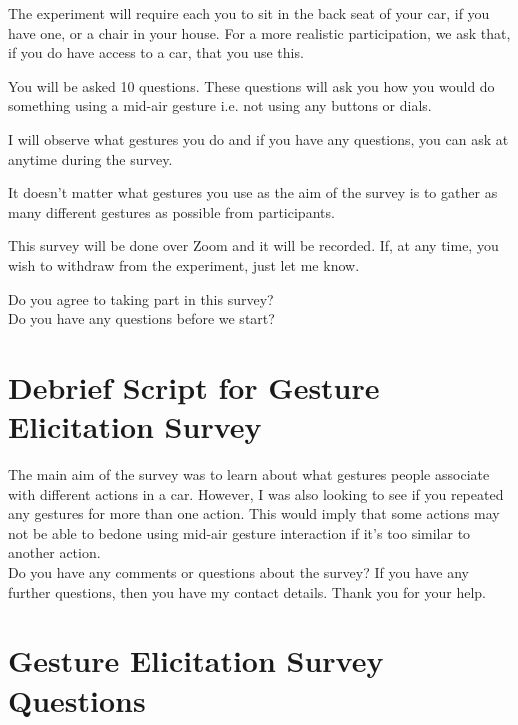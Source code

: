 \documentclass{l4proj}
\begin{document}
\begin{appendices}
The experiment will require each you to sit in the back seat of your car, if you have one, or a chair in your house. For a more realistic participation, we ask that, if you do have access to a car, that you use this.

You will be asked 10 questions. These questions will ask you how you would do something using a mid-air gesture i.e. not using any buttons or dials.

I will observe what gestures you do and if you have any questions, you can ask at anytime during the survey.

It doesn’t matter what gestures you use as the aim of the survey is to gather as many different gestures as possible from participants. 

This survey will be done over Zoom and it will be recorded. If, at any time, you wish to withdraw from the experiment, just let me know. 

Do you agree to taking part in this survey?\\Do you have any questions before we start?

\section{Debrief Script for Gesture Elicitation Survey}
\label{section:debriefScriptGE}
The main aim of the survey was to learn about what gestures people associate with different actions in a car. However, I was also looking to see if you repeated any gestures for more than one action. This would imply that some actions may not be able to bedone using mid-air gesture interaction if it’s too similar to another action.\\
Do you have any comments or questions about the survey? If you have any further questions, then you have my contact details. Thank you for your help.

\section{Gesture Elicitation Survey Questions}
\label{section:GESurveyQ}


\end{appendices}
\end{document}
